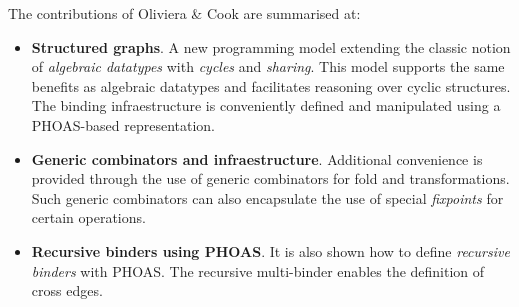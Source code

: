 


The contributions of Oliviera \& Cook are summarised at:

\begin{itemize}
  \item \textbf{Structured graphs}. A new programming model extending the classic notion of \emph{algebraic datatypes} with \emph{cycles} and \emph{sharing}. This model supports the same benefits as algebraic datatypes and facilitates reasoning over cyclic structures. The binding infraestructure is conveniently defined and manipulated using a PHOAS-based representation.
  \item \textbf{Generic combinators and infraestructure}. Additional convenience is provided through the use of generic combinators for fold and transformations. Such generic combinators can also encapsulate the use of special \emph{fixpoints} for certain operations.
  \item \textbf{Recursive binders using PHOAS}. It is also shown how to define \emph{recursive binders} with PHOAS. The recursive multi-binder enables the definition of cross edges.
\end{itemize}
